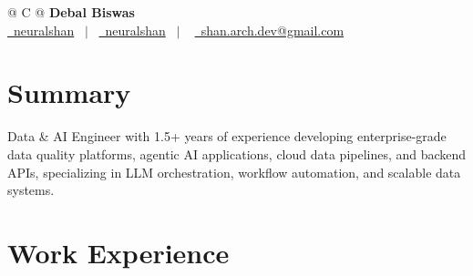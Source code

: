 \documentclass[a4paper,10pt]{article}
\begin{document}
\pagestyle{empty}



\begin{tabularx}{\linewidth}{@{} C @{}}
    \textbf{\Huge Debal Biswas} \\[7.5pt]
    \href{https://github.com/neuralshan}{\raisebox{-0.05\height}\faGithub\ neuralshan} \ $|$ \
    \href{https://linkedin.com/in/neuralshan}{\raisebox{-0.05\height}\faLinkedin\ neuralshan} \ $|$ \
    \href{mailto:shan.arch.dev@gmail.com}{\raisebox{-0.05\height}\faEnvelope \ shan.arch.dev@gmail.com} \ %
\end{tabularx}


\section{Summary}
Data \& AI Engineer with 1.5+ years of experience developing enterprise-grade data quality platforms, agentic AI applications, cloud data pipelines, and backend APIs, specializing in LLM orchestration, workflow automation, and scalable data systems.

\section{Work Experience}
\end{document}
